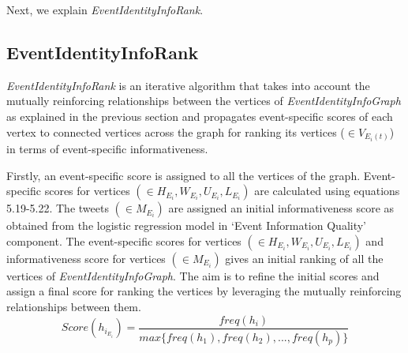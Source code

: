 









Next, we explain \textit{EventIdentityInfoRank}.


\subsection{EventIdentityInfoRank\label{eventidentityinforank}}
\textit{EventIdentityInfoRank} is an iterative algorithm that takes into account the mutually reinforcing relationships between the vertices of \textit{EventIdentityInfoGraph} as explained in the previous section and propagates event-specific scores of each vertex to connected vertices across the graph for ranking its vertices ($\in V_{E_{i}(t)}$) in terms of event-specific informativeness.

Firstly, an event-specific score is assigned to all the vertices of the graph. Event-specific scores for vertices $(\in H_{E_{i}}, W_{E_{i}}, U_{E_{i}}, L_{E_{i}})$ are calculated using equations 5.19-5.22. The tweets  $(\in M_{E_{i}})$ are assigned an initial informativeness score as obtained from the logistic regression model in `Event Information Quality' component. The event-specific scores for vertices $(\in H_{E_{i}}, W_{E_{i}}, U_{E_{i}}, L_{E_{i}})$ and informativeness score for vertices $(\in M_{E_{i}})$ gives an initial ranking of all the vertices of \textit{EventIdentityInfoGraph}. The aim is to refine the initial scores and assign a final score for ranking the vertices by leveraging the mutually reinforcing relationships between them.
\begin{equation}
Score(h_{i_{E_{i}}}) = \frac{freq(h_{i})}{max\{freq(h_{1}),freq(h_{2}),...,freq(h_{p})\}}
\end{equation}

